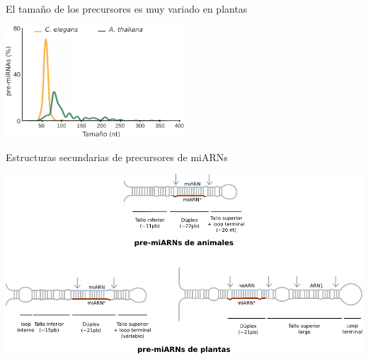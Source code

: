 \documentclass{beamer}
\begin{document}
\begin{frame}{El tamaño de los precursores es muy variado en plantas}
	\begin{center}
		\includegraphics[width=0.5\textwidth]{img/distribucion_precursores.png}
	\end{center}
\end{frame}

\begin{frame}{Estructuras secundarias de precursores de miARNs}
	\begin{center}
		\includegraphics[width=1\textwidth]{img/ss_precursores.png}
	\end{center}
\end{frame}
\end{document}
